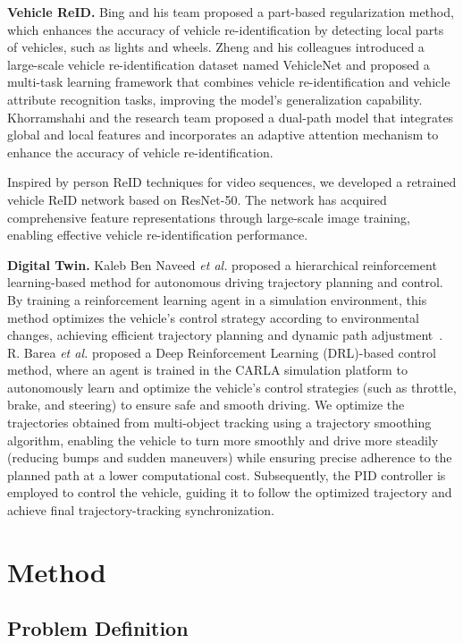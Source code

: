 \documentclass[journal,twoside,web]{ieeecolor}
\begin{document}
\textbf{Vehicle ReID.}
Bing and his team proposed a part-based regularization method, which enhances the accuracy of vehicle re-identification by detecting local parts of vehicles, such as lights and wheels\cite{Alpher19b}. 
Zheng and his colleagues introduced a large-scale vehicle re-identification dataset named VehicleNet and proposed a multi-task learning framework that combines vehicle re-identification and vehicle attribute recognition tasks, improving the model's generalization capability\cite{Alpher20f}. 
Khorramshahi and the research team proposed a dual-path model that integrates global and local features and incorporates an adaptive attention mechanism to enhance the accuracy of vehicle re-identification\cite{Alpher19c}.

Inspired by person ReID techniques for video sequences, we developed a retrained vehicle ReID network based on ResNet-50. 
The network has acquired comprehensive feature representations through large-scale image training, enabling effective vehicle re-identification performance.

\textbf{Digital Twin.}
Kaleb Ben Naveed \textit{et al.} proposed a hierarchical reinforcement learning-based method for autonomous driving trajectory planning and control. 
By training a reinforcement learning agent in a simulation environment, this method optimizes the vehicle's control strategy according to environmental changes, achieving efficient trajectory planning and dynamic path adjustment~\cite{Alpher22}.
R. Barea \textit{et al.} proposed a Deep Reinforcement Learning (DRL)-based control method, where an agent is trained in the CARLA simulation platform to autonomously learn and optimize the vehicle's control strategies (such as throttle, brake, and steering) to ensure safe and smooth driving\cite{Alpher21}.
We optimize the trajectories obtained from multi-object tracking using a trajectory smoothing algorithm, enabling the vehicle to turn more smoothly and drive more steadily (reducing bumps and sudden maneuvers) while ensuring precise adherence to the planned path at a lower computational cost. 
Subsequently, the PID controller is employed to control the vehicle, guiding it to follow the optimized trajectory and achieve final trajectory-tracking synchronization.


\section{Method}

\subsection{Problem Definition}
\end{document}

